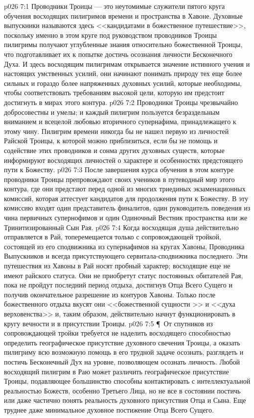 \vs p026 7:1 Проводники Троицы --- это неутомимые служители пятого круга обучения восходящих пилигримов времени и пространства в Хавоне. Духовные выпускники называются здесь <<кандидатами в божественное путешествие>>, поскольку именно в этом круге под руководством проводников Троицы пилигримы получают углубленные знания относительно божественной Троицы, что подготавливает их к попытке достичь осознания личности Бесконечного Духа. И здесь восходящим пилигримам открывается значение истинного учения и настоящих умственных усилий, они начинают понимать природу тех еще более сильных и гораздо более напряженных духовных усилий, которые необходимы, чтобы соответствовать требованиям высокой цели, которую им предстоит достигнуть в мирах этого контура.
\vs p026 7:2 Проводники Троицы чрезвычайно добросовестны и умелы; и каждый пилигрим пользуется безраздельным вниманием и всецелой любовью вторичного супернафима, принадлежащего к этому чину. Пилигрим времени никогда бы не нашел первую из личностей Райской Троицы, к которой можно приблизиться, если бы не помощь и содействие этих проводников и сонма других духовных существ, которые информируют восходящих личностей о характере и особенностях предстоящего пути к Божеству.
\vs p026 7:3 После завершения курса обучения в этом контуре проводники Троицы препровождают своих учеников в путеводный мир этого контура, где они предстают перед одной из многих триединых экзаменационных комиссий, которая аттестует кандидатов для продолжения пути к Божеству. В эту комиссию входят один представитель финалитов, один руководитель поведения из чина первичных супернофимов и один Одиночный Вестник пространства или же Тринитизированный Сын Рая.
\vs p026 7:4 Когда восходящая душа действительно отправляется в Рай, топеремещается только с сопровождающей тройкой, состоящей из его сподвижника из супернафимов на кругах Хавоны, Проводника Выпускников и всегда присутствующего сервитала\hyp{}сподвижника последнего. Эти путешествия из Хавоны в Рай носят пробный характер; восходящие еще не имеют райского статуса. Они не приобретут статус постоянных обитателей Рая, пока не пройдут последний период отдыха, достигнув Отца Всего Сущего и получив окончательное разрешение из контуров Хавоны. Только после божественного отдыха вкусят они <<божественной сущности >> и <<духа верховенства>> и, таким образом, действительно начнут функционировать в кругу вечности и в присутствии Троицы.
\vs p026 7:5 \P\ От спутников из сопровождающей тройки требуется не наделить восходящего способностью определить географическое присутствие духовного свечения Троицы, а оказать пилигриму всю возможную помощь в его трудной задаче осознать, разглядеть и постичь Бесконечный Дух на уровне, позволяющем осознать личность. Любой восходящий пилигрим в Раю может различить географическое присутствие Троицы, подавляющее большинство способны контактировать с интеллектуальной реальностью Божеств, особенно Третьего Лица, но не все в состоянии постичь или даже частично понять реальность духовного присутствия Отца и Сына. Еще труднее даже минимальное духовное постижение Отца Всего Сущего.
